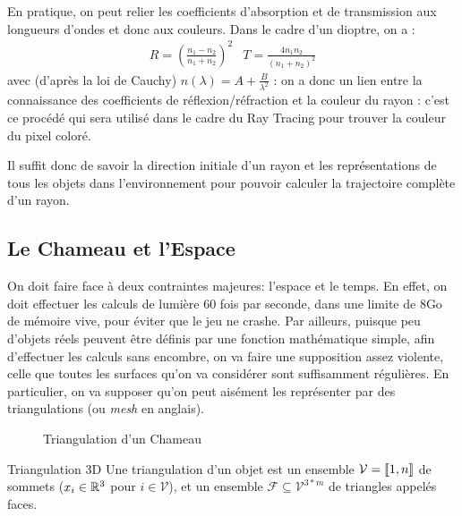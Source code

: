 \documentclass{classe}
\begin{document}
En pratique, on peut relier les coefficients d'absorption et de transmission aux longueurs d'ondes et donc aux couleurs. Dans le cadre d'un dioptre, on a :
$$\begin{array}{cc}
R = \left(\frac{n_1-n_2}{n_1+n_2}\right)^2 & T = \frac{4n_1n_2}{(n_1+n_2)^2}
\end{array}$$
avec (d'après la loi de Cauchy) $n(\lambda) = A + \frac{B}{\lambda^2}$ : on a donc un lien entre la connaissance des coefficients de réflexion/réfraction et la couleur du rayon : c'est ce procédé qui sera utilisé dans le cadre du Ray Tracing pour trouver la couleur du pixel coloré.

Il suffit donc de savoir la direction initiale d'un rayon et les représentations de tous les objets dans l'environnement pour pouvoir calculer la trajectoire complète d'un rayon.

\subsection{Le Chameau et l'Espace}
On doit faire face à deux contraintes majeures: l'espace et le temps.
En effet, on doit effectuer les calculs de lumière 60 fois par seconde, dans une limite de 8Go de mémoire vive, pour éviter que le jeu ne crashe.
Par ailleurs, puisque peu d'objets réels peuvent être définis par une fonction mathématique simple, afin d'effectuer les calculs sans encombre, on va faire une supposition assez violente, celle que toutes les surfaces qu'on va considérer sont suffisamment régulières.
En particulier, on va supposer qu'on peut aisément les représenter par des triangulations (ou \emph{mesh} en anglais).

\begin{figure}[h]
	\centering
	\caption{Triangulation d'un Chameau}
	\label{fig:camel}
\end{figure}

\begin{définition}{Triangulation 3D}{}
	Une triangulation d'un objet est un ensemble $\mathcal{V} = \left\llbracket 1, n\right\rrbracket$ de sommets ($x_{i} \in \mathbb{R}^{3}$ pour $i \in \mathcal{V}$), et un ensemble $\mathcal{F} \subseteq \mathcal{V}^{3 * m}$ de triangles appelés faces.
\end{définition}
\end{document}
